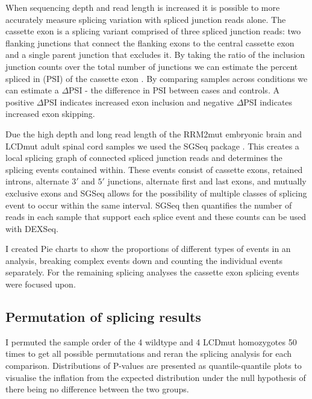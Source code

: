 When sequencing depth and read length is increased it is possible to more accurately measure splicing variation with spliced junction reads alone. The cassette exon is a splicing variant comprised of three spliced junction reads: two flanking junctions that connect the flanking exons to the central cassette exon and a single parent junction that excludes it. By taking the ratio of the inclusion junction counts over the total number of junctions we can estimate the percent spliced in (PSI) of the cassette exon \citep{Katz2010-ir}. By comparing samples across conditions we can estimate a $\Delta$PSI - the difference in PSI between cases and controls. A positive $\Delta$PSI indicates increased exon inclusion and negative $\Delta$PSI indicates increased exon skipping. 

Due the high depth and long read length of the RRM2mut embryonic brain and LCDmut adult spinal cord samples we used the SGSeq package \citep{Goldstein2016}. This creates a local splicing graph of connected spliced junction reads and determines the splicing events contained within. These events consist of cassette exons, retained introns, alternate $3'$ and $5'$ junctions, alternate first and last exons, and mutually exclusive exons and SGSeq allows for the possibility of multiple classes of splicing event to occur within  the same interval. SGSeq  then quantifies  the number of  reads in each sample  that support each splice event and these counts can be used with DEXSeq. 

I created Pie charts to show the proportions of different types of events in an analysis, breaking complex  events  down  and  counting  the  individual  events  separately.  For  the  remaining splicing analyses the cassette exon splicing events were focused upon.


\subsection{Permutation of splicing results}
I permuted the sample order of the 4 wildtype and 4 LCDmut homozygotes 50 times to get all possible permutations and reran the splicing analysis for each comparison. Distributions of P-values are presented as quantile-quantile plots to visualise the inflation from the expected distribution under the null hypothesis of there being no difference between the two groups. 

